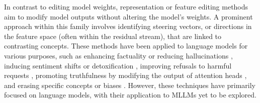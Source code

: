  In contrast to editing model weights, representation or feature editing methods \cite{wu2024reft,subramani2022extracting,turner2023activation} aim to modify model outputs without altering the model’s weights. A prominent approach within this family involves identifying steering vectors, or directions in the feature space (often within the residual stream), that are linked to contrasting concepts. These methods have been applied to language models for various purposes, such as enhancing factuality or reducing hallucinations \cite{panickssery2023steeringllama2}, inducing sentiment shifts or detoxification \cite{turner2023activation,tigges2023linear}, improving refusals to harmful requests \cite{arditi2024refusal}, promoting truthfulness by modifying the output of attention heads \cite{li2024inference}, and erasing specific concepts or biases \cite{belrose2024leace,ravfogel2022linear}. However, these techniques have primarily focused on language models, with their application to MLLMs yet to be explored.















